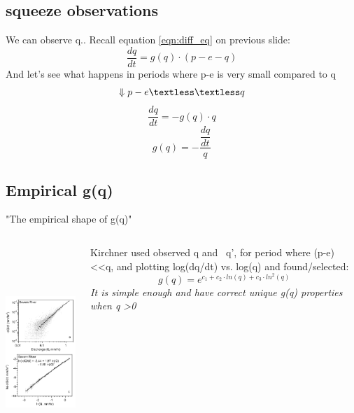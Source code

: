 \documentclass{beamer}
\begin{document}
\subsection{squeeze observations}
\begin{frame}{We can observe q..}
	Recall equation \ref{eqn:diff_eq} on previous slide:
	\begin{equation}
		\dfrac{dq}{dt}=g(q) \cdot (p-e-q)
	\end{equation}
	And let's see what happens in periods where p-e is very small compared to q
	\begin{equation}
	\Downarrow  p-e \textless\textless q
	\end{equation}
	\begin{equation}
		\dfrac{dq}{dt}=-g(q) \cdot q
	\end{equation}
	\begin{equation}
	g(q)= -\dfrac{\dfrac{dq}{dt}}{q}
	\end{equation}
\end{frame}
\subsection{Empirical g(q)}
\begin{frame}{"The empirical shape of g(q)"}
	\begin{columns}
		\begin{column}{.45\textwidth}
	        \includegraphics[width=5cm,height=8cm,keepaspectratio]{kirchner_severn_river_fig2.png}
	    \end{column}
        \begin{column}{.45\textwidth}
			Kirchner used observed q and ~q', for period where (p-e) \textless\textless q, and plotting log(dq/dt) vs. log(q) and found/selected:
			\begin{equation}
			g(q)=e^{c_1+ c_2 \cdot ln(q)+ c_3 \cdot ln^{2}(q)}
			\end{equation}
			\emph{It is simple enough and have correct unique g(q) properties when q \textgreater 0}
		\end{column}
	\end{columns}
\end{frame}
\end{document}
